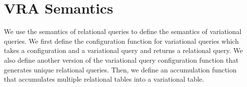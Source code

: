 \section{VRA Semantics }
\label{sec:vrasem}


We use the semantics of relational queries to define the semantics of 
variational queries. We first define the configuration function
for variational queries which takes a configuration and a variational query
and returns a relational query. We also define another version of the
variational query configuration function that generates unique relational
queries. Then, we define an accumulation function that accumulates
multiple relational tables into a variational table. 
%


